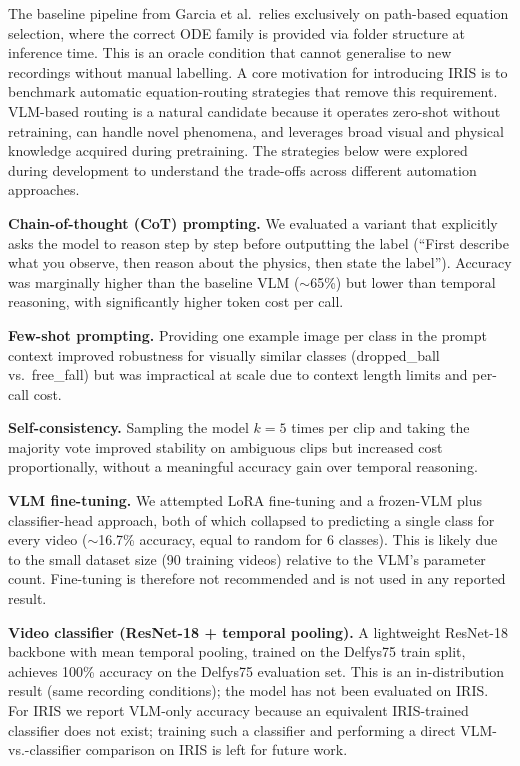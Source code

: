 \documentclass[runningheads]{llncs}
\begin{document}
The baseline pipeline from Garcia et al.\ relies exclusively on path-based
equation selection, where the correct ODE family is provided via folder
structure at inference time.  This is an oracle condition that cannot
generalise to new recordings without manual labelling.  A core motivation
for introducing IRIS is to benchmark automatic equation-routing strategies
that remove this requirement.  VLM-based routing is a natural candidate
because it operates zero-shot without retraining, can handle novel phenomena,
and leverages broad visual and physical knowledge acquired during pretraining.
The strategies below were explored during development to understand the
trade-offs across different automation approaches.

\textbf{Chain-of-thought (CoT) prompting.} We evaluated a variant that
explicitly asks the model to reason step by step before outputting the label
(``First describe what you observe, then reason about the physics, then
state the label'').  Accuracy was marginally higher than the baseline
VLM ($\sim$65\%) but lower than temporal reasoning, with significantly
higher token cost per call.

\textbf{Few-shot prompting.} Providing one example image per class in the
prompt context improved robustness for visually similar classes
(dropped\_ball vs.\ free\_fall) but was impractical at scale due to context
length limits and per-call cost.

\textbf{Self-consistency.} Sampling the model $k = 5$ times per clip and
taking the majority vote improved stability on ambiguous clips but increased
cost proportionally, without a meaningful accuracy gain over temporal reasoning.

\textbf{VLM fine-tuning.} We attempted LoRA fine-tuning and a frozen-VLM
plus classifier-head approach, both of which collapsed to predicting a single
class for every video ($\sim$16.7\% accuracy, equal to random for 6 classes).
This is likely due to the small dataset size (90 training videos) relative
to the VLM's parameter count.  Fine-tuning is therefore not recommended
and is not used in any reported result.

\textbf{Video classifier (ResNet-18 + temporal pooling).} A lightweight
ResNet-18 backbone with mean temporal pooling, trained on the Delfys75
train split, achieves 100\% accuracy on the Delfys75 evaluation set.
This is an in-distribution result (same recording conditions); the model
has not been evaluated on IRIS.  For IRIS we report VLM-only accuracy
because an equivalent IRIS-trained classifier does not exist; training such
a classifier and performing a direct VLM-vs.-classifier comparison on IRIS
is left for future work.
\end{document}
